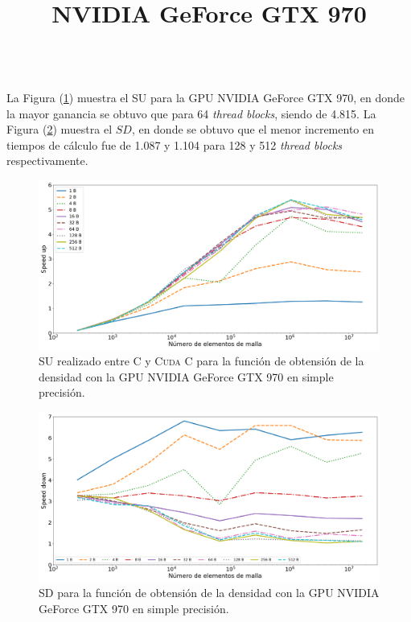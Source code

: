 \newpage
%
\title{\textbf{NVIDIA GeForce GTX 970}}\\


La Figura (\ref{fig:s_cuda_970_test_simple_10}) muestra el SU para la GPU NVIDIA GeForce GTX 970, en donde la mayor ganancia se obtuvo que para 64 \textit{thread blocks}, siendo de 4.815. La Figura (\ref{fig:s_py_970_test_simple_10}) muestra el $SD$, en donde se obtuvo que el menor incremento en tiempos de cálculo fue de 1.087 y 1.104 para 128 y 512  \textit{thread blocks} respectivamente. 

\begin{figure}[h!]
	\centering
	\includegraphics[width=\textwidth]{figs/cap4/s_cuda_970_test_simple_10}
	\caption{SU realizado entre \textsc{C} y \textsc{Cuda C} para la función de obtensión de la densidad con la GPU NVIDIA GeForce GTX 970 en simple precisión.} 
	\label{fig:s_cuda_970_test_simple_10}	
\end{figure}

\begin{figure}[h!]
	\centering
	\includegraphics[width=\textwidth]{figs/cap4/s_py_970_test_simple_10}
	\caption{SD para la función de obtensión de la densidad con la GPU NVIDIA GeForce GTX 970 en simple precisión.} 
	\label{fig:s_py_970_test_simple_10}	
\end{figure}

